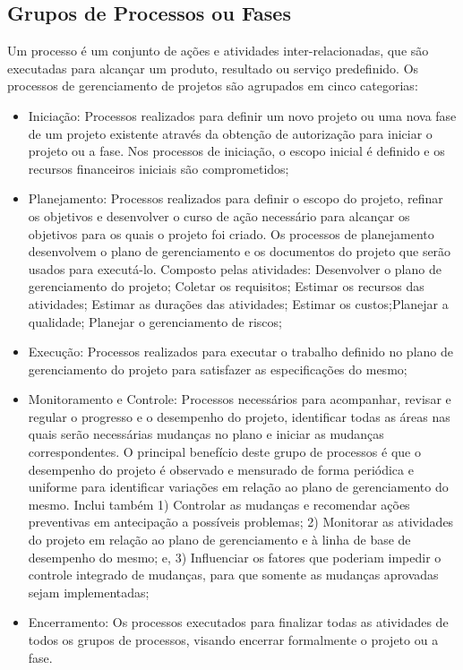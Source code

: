 \subsection{Grupos de Processos ou Fases}
Um processo é um conjunto de ações e atividades inter-relacionadas, que são executadas para alcançar um produto, resultado ou serviço predefinido. Os processos de gerenciamento de projetos são agrupados em cinco categorias:
\begin{itemize}
	\item Iniciação: Processos realizados para definir um novo projeto ou uma nova fase de um projeto existente através da obtenção de autorização para iniciar o projeto ou a fase. Nos processos de iniciação, o escopo inicial é definido e os recursos financeiros iniciais são comprometidos;
	\item Planejamento: Processos realizados para definir o escopo do projeto, refinar os objetivos e desenvolver o curso de ação necessário para alcançar os objetivos para os quais o projeto foi criado. Os processos de planejamento desenvolvem o plano de gerenciamento e os documentos do projeto que serão usados para executá-lo. Composto pelas atividades: Desenvolver o plano de gerenciamento do projeto; Coletar os requisitos; Estimar os recursos das atividades; Estimar as durações das atividades; Estimar os custos;Planejar a qualidade; Planejar o gerenciamento de riscos;
	\item Execução: Processos realizados para executar o trabalho definido no plano de gerenciamento do projeto para satisfazer as especificações do mesmo;
	\item Monitoramento e Controle: Processos necessários para acompanhar, revisar e regular o progresso e o desempenho do projeto, identificar todas as áreas nas quais serão necessárias mudanças no plano e iniciar as mudanças correspondentes. O principal benefício deste grupo de processos é que o desempenho do projeto é observado e mensurado de forma periódica e uniforme para identificar variações em relação ao plano de gerenciamento do mesmo. Inclui também 1) Controlar as mudanças e recomendar ações preventivas em antecipação a possíveis problemas; 2) Monitorar as atividades do projeto em relação ao plano de gerenciamento e à linha de base de desempenho do mesmo; e, 3) Influenciar os fatores que poderiam impedir o controle integrado de mudanças, para que somente as mudanças aprovadas sejam implementadas;
	\item Encerramento: Os processos executados para finalizar todas as atividades de todos os grupos de processos, visando encerrar formalmente o projeto ou a fase.
\end{itemize}

